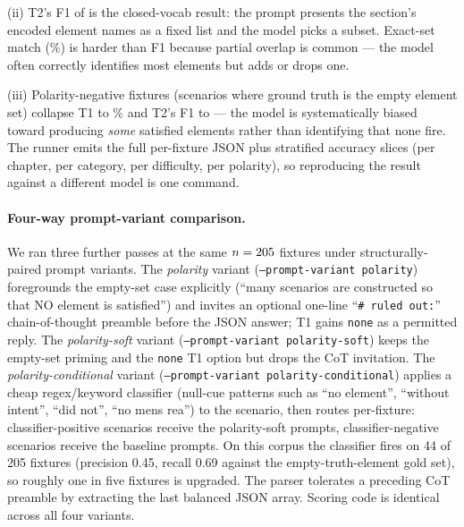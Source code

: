 (ii) T2's F1 of \statBenchmarkLlmTtwoFOne{} is the closed-vocab
result: the prompt presents the section's encoded element names
as a fixed list and the model picks a subset. Exact-set match
(\statBenchmarkLlmTtwo{}\%) is harder than F1 because partial
overlap is common --- the model often correctly identifies most
elements but adds or drops one.

(iii) Polarity-negative fixtures
(scenarios where ground truth is the empty element set) collapse
T1 to \statBenchmarkLlmNegPolarTone{}\% and T2's F1 to
\statBenchmarkLlmNegPolarFOne{} --- the model is systematically
biased toward producing \emph{some} satisfied elements rather
than identifying that none fire. The runner emits the full
per-fixture JSON plus stratified accuracy slices (per chapter,
per category, per difficulty, per polarity), so reproducing the
result against a different model is one command.

\paragraph{Four-way prompt-variant comparison.}
We ran three further \statBenchmarkLlmModel{} passes at the same
$n = 205{}$ fixtures under structurally-paired
prompt variants. The \emph{polarity} variant
(\texttt{--prompt-variant polarity}) foregrounds the empty-set
case explicitly (``many scenarios are constructed so that NO
element is satisfied'') and invites an optional one-line
``\texttt{\# ruled out:}'' chain-of-thought preamble before the
JSON answer; T1 gains \texttt{none} as a permitted reply. The
\emph{polarity-soft} variant (\texttt{--prompt-variant
polarity-soft}) keeps the empty-set priming and the \texttt{none}
T1 option but drops the CoT invitation. The
\emph{polarity-conditional} variant
(\texttt{--prompt-variant polarity-conditional}) applies a cheap
regex/keyword classifier (null-cue patterns such as ``no
element'', ``without intent'', ``did not'', ``no mens rea'') to
the scenario, then routes per-fixture: classifier-positive
scenarios receive the polarity-soft prompts, classifier-negative
scenarios receive the baseline prompts. On this corpus the
classifier fires on 44 of 205 fixtures (precision 0.45, recall
0.69 against the empty-truth-element gold set), so roughly one in
five fixtures is upgraded. The parser tolerates a preceding CoT
preamble by extracting the last balanced JSON array. Scoring
code is identical across all four variants.

